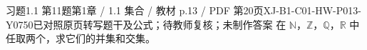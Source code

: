 \par\noindent\begin{minipage}{\linewidth}
\begin{bankitem}{习题1.1 第11题}{第1章 / 1.1 集合 / 教材 p.13 / PDF 第20页}{XJ-B1-C01-HW-P013-Y0750}{已对照原页转写题干及公式；待教师复核；未制作答案}
在 $\mathbb N$，$\mathbb Z$，$\mathbb Q$，$\mathbb R$ 中任取两个，求它们的并集和交集。
\end{bankitem}
\end{minipage}\par\medskip

